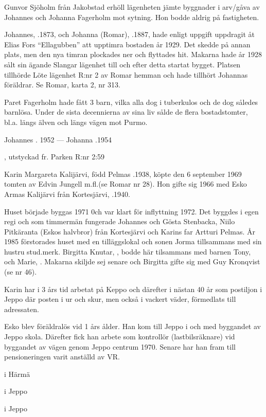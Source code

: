 Gunvor Sjöholm från Jakobstad erhöll lägenheten jämte byggnader i arv/gåva av Johannes och Johanna Fagerholm mot sytning. Hon bodde aldrig på fastigheten.


Johannes, .1873, och Johanna (Romar), .1887, hade enligt uppgift uppdragit åt Elias Fors ``Ellagubben'' att upptimra bostaden år 1929. Det skedde på annan plats, men den nya timran plockades ner och flyttades hit. Makarna hade år 1928 sålt sin ägande Slangar lägenhet till  och efter detta startat bygget. Platsen tillhörde Löte lägenhet R:nr 2 av Romar hemman och hade tillhört Johannas föräldrar. Se Romar, karta 2, nr 313.

Paret Fagerholm hade fått 3 barn, vilka alla dog i tuberkulos och de dog således barnlösa. Under de sista decennierna av sina liv sålde de flera bostadstomter,  bl.a. längs älven och längs vägen mot Purmo.

Johannes . 1952  ---  Johanna .1954



, utstyckad fr. Parken R:nr 2:59



Karin Margareta Kalijärvi, född Pelmas .1938, köpte den 6 september 1969 tomten av Edvin Jungell m.fl.(se Romar nr 28). Hon gifte sig 1966 med Esko Armas Kalijärvi från Kortesjärvi, .1940.

Huset började byggas 1971 0ch var klart för inflyttning 1972. Det byggdes i egen regi och som timmermän fungerade Johannes och Gösta Stenbacka, Niilo Pitkäranta (Eskos halvbror) från Kortesjärvi och Karins far Artturi Pelmas. År 1985 förstorades huset med en tilläggslokal och sonen Jorma tillsammans med sin hustru stud.merk. Birgitta Knutar, , bodde här tilsammans med barnen Tony, 
och Marie, . Makarna skiljde sej senare och Birgitta gifte sig med Guy Kronqvist (se nr 46).

Karin har i 3 års tid arbetat på Keppo och därefter i nästan 40 år som postiljon i Jeppo där posten i ur och skur, men också i vackert väder, förmedlats till adressaten.

Esko blev föräldralös vid 1 års ålder. Han kom till Jeppo i och med byggandet av Jeppo skola. Därefter fick han arbete som kontrollör (lastbilsräknare) vid byggandet av vägen genom Jeppo centrum 1970. Senare har han fram till pensioneringen varit anställd av VR.
\begin{jhchildren}
  \item {} i Härmä
  \item {} i Jeppo
  \item {} i Jeppo
\end{jhchildren}

